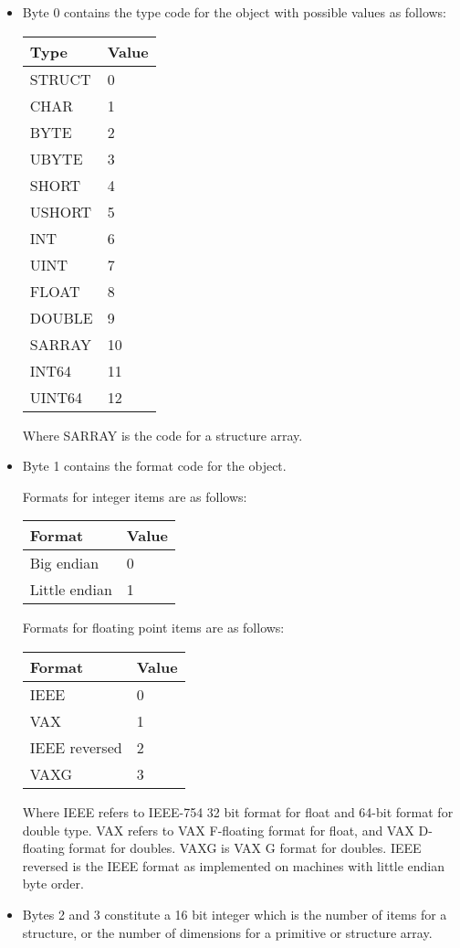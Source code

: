 \begin{itemize}

\item Byte 0 contains the type code for the object with possible values as
follows:

\begin{tabular}{|l|l|}
\hline
Type & Value \\
\hline
STRUCT & 0 \\
CHAR & 1 \\
BYTE & 2 \\
UBYTE & 3 \\
SHORT & 4 \\
USHORT & 5 \\
INT & 6 \\
UINT & 7 \\
FLOAT & 8 \\
DOUBLE & 9 \\
SARRAY & 10 \\
INT64 & 11 \\
UINT64 & 12 \\
\hline
\end{tabular}

Where SARRAY is the code for a structure array.

\item Byte 1 contains the format code for the object.

Formats for integer items are as follows:

\begin{tabular}{|l|l|}
\hline
Format & Value \\
\hline
Big endian & 0 \\
Little endian & 1 \\
\hline
\end{tabular}

Formats for floating point items are as follows:

\begin{tabular}{|l|l|}
\hline
Format & Value \\
\hline
IEEE & 0 \\
VAX & 1 \\
IEEE reversed & 2 \\
VAXG & 3 \\
\hline
\end{tabular}

Where IEEE refers to IEEE-754 32 bit format for float and 64-bit format for
double type. VAX refers to VAX F-floating format for float, and VAX D-floating
format for doubles. VAXG is VAX G format for doubles. IEEE reversed is
the IEEE format as implemented on machines with little endian byte order.

\item Bytes 2 and 3 constitute a 16 bit integer which is the number of items
for a structure, or the number of dimensions for a primitive or structure
array.

\end{itemize}

